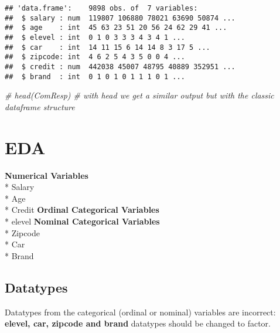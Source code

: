 \documentclass[
]{article}
\newenvironment{Shaded}{\begin{snugshade}}{\end{snugshade}}
\newcommand{\CommentTok}[1]{\textcolor[rgb]{0.56,0.35,0.01}{\textit{#1}}}
\begin{document}
\begin{verbatim}
## 'data.frame':    9898 obs. of  7 variables:
##  $ salary : num  119807 106880 78021 63690 50874 ...
##  $ age    : int  45 63 23 51 20 56 24 62 29 41 ...
##  $ elevel : int  0 1 0 3 3 3 4 3 4 1 ...
##  $ car    : int  14 11 15 6 14 14 8 3 17 5 ...
##  $ zipcode: int  4 6 2 5 4 3 5 0 0 4 ...
##  $ credit : num  442038 45007 48795 40889 352951 ...
##  $ brand  : int  0 1 0 1 0 1 1 1 0 1 ...
\end{verbatim}

\begin{Shaded}
\begin{Highlighting}[]
\CommentTok{\# head(ComResp) \# with head we get a similar output but with the classic dataframe structure}
\end{Highlighting}
\end{Shaded}

\hypertarget{eda}{%
\section{EDA}\label{eda}}

\textbf{Numerical Variables}\\
* Salary\\
* Age\\
* Credit \textbf{Ordinal Categorical Variables}\\
* elevel \textbf{Nominal Categorical Variables}\\
* Zipcode\\
* Car\\
* Brand

\hypertarget{datatypes}{%
\subsection{Datatypes}\label{datatypes}}

Datatypes from the categorical (ordinal or nominal) variables are
incorrect: \textbf{elevel, car, zipcode and brand} datatypes should be
changed to factor.
\end{document}
